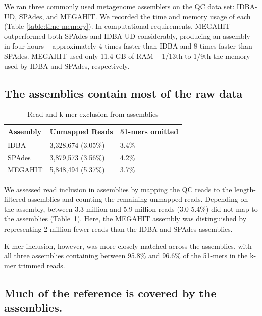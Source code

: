 \documentclass[10pt,a4paper,twocolumn]{article}
\begin{document}
 We ran three commonly used metagenome assemblers on the QC data set:
IDBA-UD, SPAdes, and MEGAHIT. We recorded the time and memory usage of
each (Table \ref{table:time-memory}).  In computational requirements, MEGAHIT outperformed both
SPAdes and IDBA-UD considerably, producing an assembly in four hours --
approximately 4 times faster than IDBA and 8 times faster than
SPAdes.  MEGAHIT used only 11.4 GB of RAM -- 1/13th to 1/9th
the memory used by IDBA and SPAdes, respectively.


\subsection*{The assemblies contain most of the raw data}



\begin{table}[!h]
\centering
\caption{Read and k-mer exclusion from assemblies}
\begin{tabular}{|p{1.5cm}|p{1.5cm}|p{2.5cm}|}\hline
  \textbf{Assembly} & \textbf{Unmapped Reads} & \textbf {51-mers omitted}
  \\ \hline
IDBA &3,328,674 (3.05\%)&  3.4\% \\ \hline
SPAdes &3,879,573 (3.56\%) &  4.2\% \\ \hline
MEGAHIT &5,848,494 (5.37\%) &   3.7\% \\ \hline
\end{tabular}
\label{table:reads-kmers}
\end{table}

We assessed read inclusion in assemblies by mapping the QC reads to
the length-filtered assemblies and counting the remaining unmapped
reads. Depending on the assembly, between 3.3 million and 5.9 million
reads (3.0-5.4\%) did not map to the assemblies
(Table~\ref{table:reads-kmers}). Here, the MEGAHIT assembly was distinguished by representing 2 million fewer reads than the IDBA and SPAdes assemblies.

K-mer inclusion, however, was more closely matched across the assemblies,
with all three assemblies containing between 95.8\% and 96.6\% of the
51-mers in the k-mer trimmed reads.



\subsection*{Much of the reference is covered by the assemblies.}
\end{document}
